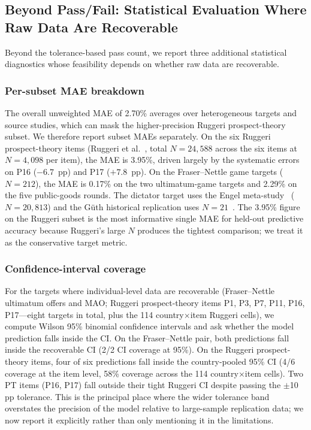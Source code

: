 \documentclass[journal]{IEEEtran}
\begin{document}
\subsection{Beyond Pass/Fail: Statistical Evaluation Where Raw Data Are Recoverable}
\label{sec:statistical-eval}

Beyond the tolerance-based pass count, we report three additional statistical diagnostics whose feasibility depends on whether raw data are recoverable.

\subsubsection{Per-subset MAE breakdown}
The overall unweighted MAE of 2.70\% averages over heterogeneous targets and source studies, which can mask the higher-precision Ruggeri prospect-theory subset.
We therefore report subset MAEs separately.
On the six Ruggeri prospect-theory items (Ruggeri et al.~\cite{ruggeri2020}, total $N=24{,}588$ across the six items at $N=4{,}098$ per item), the MAE is 3.95\%, driven largely by the systematic errors on P16 ($-6.7$~pp) and P17 ($+7.8$~pp).
On the Fraser--Nettle game targets ($N=212$), the MAE is 0.17\% on the two ultimatum-game targets and 2.29\% on the five public-goods rounds.
The dictator target uses the Engel meta-study~\cite{engel2011} ($N=20{,}813$) and the G\"uth historical replication uses $N=21$~\cite{guth1982}.
The 3.95\% figure on the Ruggeri subset is the most informative single MAE for held-out predictive accuracy because Ruggeri's large $N$ produces the tightest comparison; we treat it as the conservative target metric.

\subsubsection{Confidence-interval coverage}
For the targets where individual-level data are recoverable (Fraser--Nettle ultimatum offers and MAO; Ruggeri prospect-theory items P1, P3, P7, P11, P16, P17---eight targets in total, plus the 114 country$\times$item Ruggeri cells), we compute Wilson 95\% binomial confidence intervals and ask whether the model prediction falls inside the CI.
On the Fraser--Nettle pair, both predictions fall inside the recoverable CI (2/2 CI coverage at 95\%).
On the Ruggeri prospect-theory items, four of six predictions fall inside the country-pooled 95\% CI (4/6 coverage at the item level, 58\% coverage across the 114 country$\times$item cells).
Two PT items (P16, P17) fall outside their tight Ruggeri CI despite passing the $\pm$10\,pp tolerance.
This is the principal place where the wider tolerance band overstates the precision of the model relative to large-sample replication data; we now report it explicitly rather than only mentioning it in the limitations.
\end{document}

